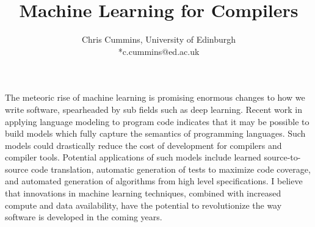 \documentclass{article}
\title{Machine Learning for Compilers}
\author{Chris Cummins, University of Edinburgh\\*c.cummins@ed.ac.uk}
\begin{document}
  \maketitle

  \noindent
  The meteoric rise of machine learning is promising enormous changes to how we
  write software, spearheaded by sub fields such as deep learning. Recent work
  in applying language modeling to program code indicates that it may be
  possible to build models which fully capture the semantics of programming
  languages. Such models could drastically reduce the cost of development for
  compilers and compiler tools. Potential applications of such models include
  learned source-to-source code translation, automatic generation of tests to
  maximize code coverage, and automated generation of algorithms from high level
  specifications. I believe that innovations in machine learning techniques,
  combined with increased compute and data availability, have the potential to
  revolutionize the way software is developed in the coming years.
\end{document}
